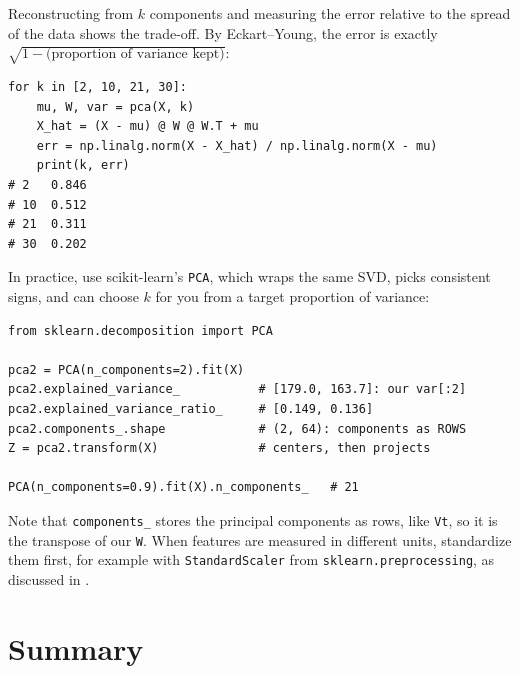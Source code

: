 Reconstructing from $k$ components and measuring the error relative to
the spread of the data shows the trade-off. By Eckart--Young, the error is
exactly $\sqrt{1 - \text{(proportion of variance kept)}}$:

\begin{lstlisting}
for k in [2, 10, 21, 30]:
    mu, W, var = pca(X, k)
    X_hat = (X - mu) @ W @ W.T + mu
    err = np.linalg.norm(X - X_hat) / np.linalg.norm(X - mu)
    print(k, err)
# 2   0.846
# 10  0.512
# 21  0.311
# 30  0.202
\end{lstlisting}

In practice, use scikit-learn's \texttt{PCA}, which wraps the same SVD,
picks consistent signs, and can choose $k$ for you from a target
proportion of variance:

\begin{lstlisting}
from sklearn.decomposition import PCA

pca2 = PCA(n_components=2).fit(X)
pca2.explained_variance_           # [179.0, 163.7]: our var[:2]
pca2.explained_variance_ratio_     # [0.149, 0.136]
pca2.components_.shape             # (2, 64): components as ROWS
Z = pca2.transform(X)              # centers, then projects

PCA(n_components=0.9).fit(X).n_components_   # 21
\end{lstlisting}

Note that \texttt{components\_} stores the principal components as rows,
like \texttt{Vt}, so it is the transpose of our \texttt{W}. When features
are measured in different units, standardize them first, for example with
\texttt{StandardScaler} from \texttt{sklearn.preprocessing}, as discussed in
.

\section{Summary}
\label{sec:ch04-summary}

